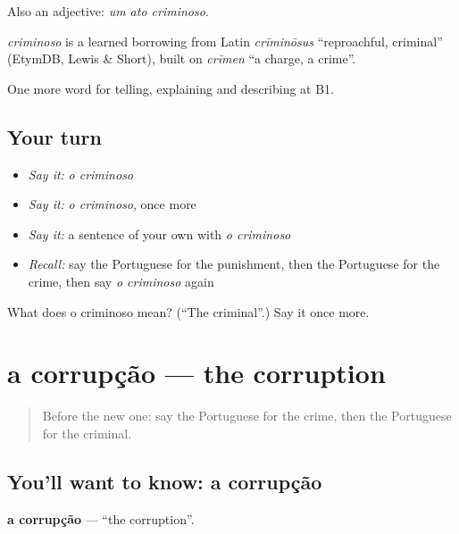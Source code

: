 Also an adjective: \emph{um ato criminoso}.

\begin{cousinweb}
\emph{criminoso} is a learned borrowing from Latin \emph{crīminōsus} \textquotedblleft{}reproachful, criminal\textquotedblright{} (EtymDB, Lewis \& Short), built on \emph{crīmen} \textquotedblleft{}a charge, a crime\textquotedblright{}.
\end{cousinweb}

\begin{grammarlens}[title={What you've built}]
One more word for telling, explaining and describing at B1.
\end{grammarlens}

\subsection*{Your turn}
\begin{itemize}
\raggedright
  \item \emph{Say it:} \emph{o criminoso}
  \item \emph{Say it:} \emph{o criminoso}, once more
  \item \emph{Say it:} a sentence of your own with \emph{o criminoso}
  \item \emph{Recall:} say the Portuguese for the punishment, then the Portuguese for the crime, then say \emph{o criminoso} again
\end{itemize}

\begin{tcolorbox}[breakable,colback=teal!4,colframe=teal!35!black,title={Before you move on}]
What does o criminoso mean? (\textquotedblleft{}The criminal\textquotedblright{}.) Say it once more.
\end{tcolorbox}
\section[a corrupção]{a corrupção — the corruption}

\label{lesson:PT-C389-corrupcao}



\begin{quote}
Before the new one: say the Portuguese for the crime, then the Portuguese for the criminal.
\end{quote}

\subsection*{You'll want to know: a corrupção}
\textbf{a corrupção} — \textquotedblleft{}the corruption\textquotedblright{}.


